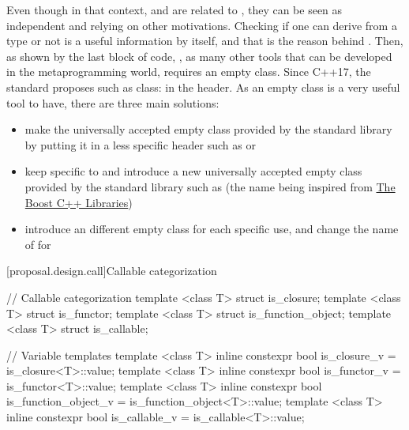 \documentclass[ebook,10pt,oneside,openany,final]{memoir}
\begin{document}
Even though in that context,  and  are related to , they can be seen as independent and relying on other motivations. Checking if one can derive from a type or not is a useful information by itself, and that is the reason behind . Then, as shown by the last block of code, , as many other tools that can be developed in the metaprogramming world, requires an empty class. Since C++17, the standard proposes such as class:  in the  header. As an empty class is a very useful tool to have, there are three main solutions:
\begin{itemize}
\item make  the universally accepted empty class provided by the standard library by putting it in a less specific header such as  or 
\item keep  specific to  and introduce a new universally accepted empty class provided by the standard library such as  (the name being inspired from \href{https://www.boost.org/doc/libs/1_66_0/boost/blank.hpp}{The Boost C++ Libraries})
\item introduce an different empty class for each specific use, and change the name of  for 
\end{itemize} 
[proposal.design.call]{Callable categorization}

\begin{codeblock}
// Callable categorization
template <class T> struct is_closure;
template <class T> struct is_functor;
template <class T> struct is_function_object;
template <class T> struct is_callable;

// Variable templates
template <class T> inline constexpr bool is_closure_v = is_closure<T>::value;
template <class T> inline constexpr bool is_functor_v = is_functor<T>::value;
template <class T> inline constexpr bool is_function_object_v = is_function_object<T>::value;
template <class T> inline constexpr bool is_callable_v = is_callable<T>::value;
\end{codeblock}
\end{document}
